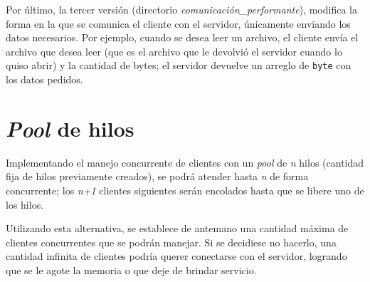Por último, la tercer versión (directorio \emph{comunicación\_performante}), modifica la forma en la que se comunica el cliente con el servidor, únicamente enviando los datos necesarios. Por ejemplo, cuando se desea leer un archivo, el cliente envía el archivo que desea leer (que es el archivo que le devolvió el servidor cuando lo quiso abrir) y la cantidad de bytes; el servidor devuelve un arreglo de \texttt{byte} con los datos pedidos.


\section{\emph{Pool} de hilos}

Implementando el manejo concurrente de clientes con un \emph{pool} de \emph{n} hilos (cantidad fija de hilos previamente creados), se podrá atender hasta \emph{n} de forma concurrente; los \emph{n+1} clientes siguientes serán encolados hasta que se libere uno de los hilos. 

Utilizando esta alternativa, se establece de antemano una cantidad máxima de clientes concurrentes que se podrán manejar. Si se decidiese no hacerlo, una cantidad infinita de clientes podría querer conectarse con el servidor, logrando que se le agote la memoria o que deje de brindar servicio.








\clearpage
\printbibliography



